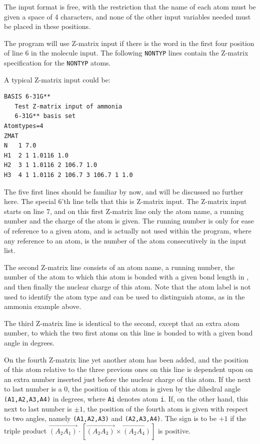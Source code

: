 The input format is free, with
the restriction that the name of each atom must be given a space
of 4 characters, and none of the other input variables needed must be
placed in these positions.

The program will use Z-matrix input if there is
the word  
in the first four position of line 6 in the molecule input.
The following {\tt NONTYP} lines contain the Z-matrix specification
for the {\tt NONTYP} atoms.

A typical Z-matrix input could be:
\begin{verbatim}
BASIS 6-31G**
   Test Z-matrix input of ammonia
   6-31G** basis set
Atomtypes=4
ZMAT
N   1 7.0
H1  2 1 1.0116 1.0
H2  3 1 1.0116 2 106.7 1.0
H3  4 1 1.0116 2 106.7 3 106.7 1 1.0
\end{verbatim}
The five first lines should be familiar by now, and will be discussed
no further here. 
The special 6'th line tells that this is Z-matrix input.
The Z-matrix input starts on line 7, and on this first Z-matrix
line only the atom name, a running number and the charge of the
atom
is given. The running number is only for
ease of reference to a given atom, and is actually not used within the
program, where any reference to an atom, is the number of the
atom consecutively in the input list.

The second Z-matrix line consists of an atom name, a running number,
the number of the atom to which this atom is bonded with a given bond
length in \angstrom{}, and then finally the nuclear charge of this atom.
Note that the atom label is not used to identify the atom type
and can be used to distinguish atoms, as in the ammonia example above.

The third Z-matrix line is identical to the second, except that an extra atom
number, to which the two first atoms on this line is bonded to with a
given bond angle in degrees.

On the fourth Z-matrix line yet another atom has been added, and the position
of this atom relative to the three previous ones on this line is
dependent upon on an extra number inserted just before the nuclear
charge of this atom. If the next to last number is a 0, the
position of this atom is given by the dihedral angle {\tt
(A1,A2,A3,A4)} in degrees, where {\tt Ai} denotes atom {\tt i}. If, on the other
hand, this next to last number is $\pm 1$, the position of the fourth
atom is given with respect to two angles, namely {\tt (A1,A2,A3)} and
{\tt (A2,A3,A4)}. The sign is to be $+ 1$ if the triple product
$\overrightarrow{\left(A_{2}A_{1}\right)}\cdot\left[\overrightarrow{\left(A_{2}A_{3}\right)}\times\overrightarrow{\left(A_{2}A_{4}\right)}\right]$
is positive.

